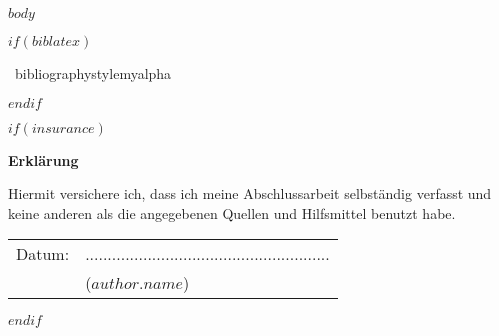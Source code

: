 \documentclass[12pt,a4paper,bibliography=totocnumbered,listof=totocnumbered]{scrartcl}
\begin{document}

\renewcommand{\sectionmark}[1]{\markright{#1}}
\renewcommand{\subsectionmark}[1]{}
\renewcommand{\subsubsectionmark}[1]{}
\rhead{} %

\onehalfspacing
\renewcommand{\thesection}{\arabic{section}}
\renewcommand{\theHsection}{\arabic{section}}
\setcounter{section}{0}
\setcounter{page}{1}

$body$


$if(biblatex)$
	\pagebreak
	\lhead{}
	\renewcommand{\refname}{Quellenverzeichnis}	

	\ bibliographystyle{myalpha}
	
	\pagebreak

$endif$

$if(insurance)$
	\newpage
	\thispagestyle{empty}
	\begin{center}
		\vspace*{5em}
		\huge\textbf{Erklärung}\\
	\end{center}
	\vspace{2em}
	Hiermit versichere ich, dass ich meine Abschlussarbeit selbständig verfasst und keine anderen als die angegebenen Quellen und Hilfsmittel benutzt habe.

	\vspace{4em}
	\begin{minipage}{\linewidth}
		\begin{tabular}{p{15em}p{15em}}
			Datum: &  .......................................................\\
			& \centering ($author.name$)\\
		\end{tabular}
	\end{minipage}
$endif$
\end{document}
